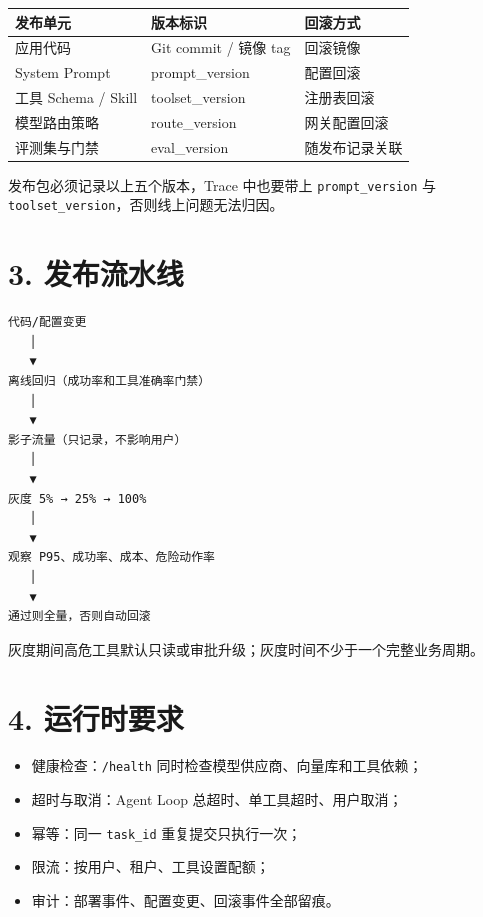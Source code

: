 \documentclass[9pt,a4paper,twocolumn]{ctexart}
\begin{document}
{\footnotesize
\begin{tabular}{|p{}|p{}|p{}|}
\hline
\textbf{发布单元} & \textbf{版本标识} & \textbf{回滚方式} \\
\hline
应用代码 & Git commit / 镜像 tag & 回滚镜像 \\
\hline
System Prompt & prompt\_version & 配置回滚 \\
\hline
工具 Schema / Skill & toolset\_version & 注册表回滚 \\
\hline
模型路由策略 & route\_version & 网关配置回滚 \\
\hline
评测集与门禁 & eval\_version & 随发布记录关联 \\
\hline
\end{tabular}
}



发布包必须记录以上五个版本，Trace 中也要带上 \texttt{prompt\_version} 与 \texttt{toolset\_version}，否则线上问题无法归因。



\section*{3. 发布流水线}


\begin{lstlisting}
代码/配置变更
   │
   ▼
离线回归（成功率和工具准确率门禁）
   │
   ▼
影子流量（只记录，不影响用户）
   │
   ▼
灰度 5% → 25% → 100%
   │
   ▼
观察 P95、成功率、成本、危险动作率
   │
   ▼
通过则全量，否则自动回滚
\end{lstlisting}



灰度期间高危工具默认只读或审批升级；灰度时间不少于一个完整业务周期。



\section*{4. 运行时要求}

\begin{itemize}[itemsep=1pt, topsep=2pt]
  \item 健康检查：\texttt{/health} 同时检查模型供应商、向量库和工具依赖；
  \item 超时与取消：Agent Loop 总超时、单工具超时、用户取消；
  \item 幂等：同一 \texttt{task\_id} 重复提交只执行一次；
  \item 限流：按用户、租户、工具设置配额；
  \item 审计：部署事件、配置变更、回滚事件全部留痕。
\end{itemize}
\end{document}
